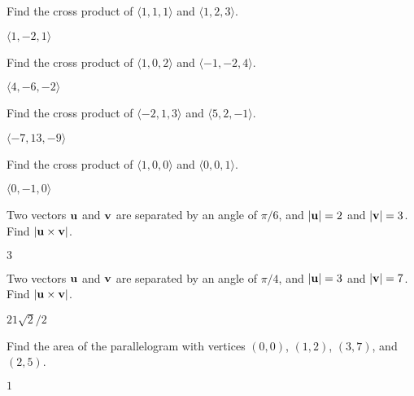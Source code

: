 \begin{enumialphparenastyle}

\begin{ex}
Find the cross product of $\langle 1,1,1\rangle$ and 
$\langle 1,2,3\rangle$. 
\begin{sol}
	$\langle 1,-2,1\rangle$
\end{sol}
\end{ex}

\begin{ex}
Find the cross product of $\langle 1,0,2\rangle$ and 
$\langle -1,-2,4\rangle$. 
\begin{sol}
	$\langle 4,-6,-2\rangle$
\end{sol}
\end{ex}

\begin{ex}
Find the cross product of $\langle -2,1,3\rangle$ and 
$\langle 5,2,-1\rangle$. 
\begin{sol}
	$\langle -7,13,-9\rangle$
\end{sol}
\end{ex}

\begin{ex}
Find the cross product of $\langle 1,0,0\rangle$ and 
$\langle 0,0,1\rangle$. 
\begin{sol}
	$\langle 0,-1,0\rangle$
\end{sol}
\end{ex}

\begin{ex}
Two vectors ${\bf u}$ and ${\bf v}$ are separated by an
angle of $\pi/6$, and $|{\bf u}|=2$ and $|{\bf v}|=3$. Find 
$|{\bf u}\times{\bf v}|$.
\begin{sol}
	$3$
\end{sol}
\end{ex}

\begin{ex}
Two vectors ${\bf u}$ and ${\bf v}$ are separated by an
angle of $\pi/4$, and $|{\bf u}|=3$ and $|{\bf v}|=7$. Find 
$|{\bf u}\times{\bf v}|$.
\begin{sol}
	$21\sqrt2/2$
\end{sol}
\end{ex}

\begin{ex}
Find the area of the parallelogram with vertices $(0,0)$, $(1,2)$,
$(3,7)$, and $(2,5)$.
\begin{sol}
	$1$
\end{sol}
\end{ex}


\end{enumialphparenastyle}
